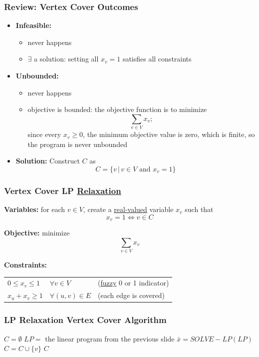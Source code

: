 \documentclass[10pt,aspectratio=169]{beamer}
\begin{document}
\begin{frame} \frametitle{Review: Vertex Cover Outcomes}
  \begin{itemize}
    \item \textbf{Infeasible:}
      \begin{itemize}
      \item never happens
      \item $\exists$ a solution: setting all $x_v=1$ satisfies all constraints
      \end{itemize}
    \item \textbf{Unbounded:}
    \begin{itemize}
      \item never happens
      \item objective is bounded: the objective function is to minimize 
        \[ \sum_{v \in V} x_v; \]
        since every $x_v \geq 0$, the minimum objective value is zero, which is finite, so the program is never unbounded
    \end{itemize}
    \item \textbf{Solution:} Construct $C$ as
      \[ C = \{ v \,|\, v \in V \text{ and } x_v=1 \} \]
    \end{itemize}
\end{frame}

\begin{frame} \frametitle{Vertex Cover LP \underline{Relaxation}}
  \textbf{Variables:} for each $v \in V$, create a \underline{real-valued} variable $x_v$ such that
  \[ x_v = 1 \Leftrightarrow v \in C \]
  
  \textbf{Objective:} minimize
  \[ \sum_{v \in V} x_v \]
  
  \textbf{Constraints:}
  \begin{tabular}{lll}
    $0 \leq x_v \leq 1$ & $\forall v \in V$ & (\underline{fuzzy} 0 or 1 indicator) \\
    $x_u + x_v \geq 1$ & $\forall (u, v) \in E$ & (each edge is covered)
  \end{tabular}
  
\end{frame}

\begin{frame} \frametitle{LP Relaxation Vertex Cover Algorithm}
  \begin{algorithmic}[1]
      \State $C = \emptyset$
      \State $LP = $ the linear program from the previous slide
      \State $\bar{x} = SOLVE-LP(LP)$ 
         
          \State $C = C \cup \{v \}$
        \EndIf
      \EndFor
      \State \Return $C$
    \EndFunction
  \end{algorithmic}
\end{frame}
\end{document}
